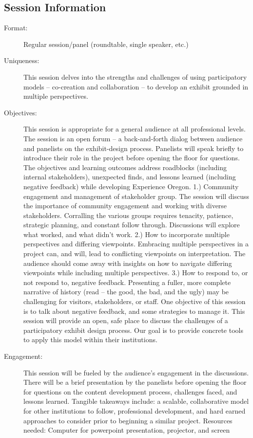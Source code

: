 \documentclass{report}
\begin{document}
              \subsection*{Session Information}
                \begin{description}
                  \item [Format:] Regular session/panel (roundtable, single speaker, etc.)
							    
							    \item [Uniqueness:]This session delves into the strengths and challenges of using participatory models – co-creation and collaboration – to develop an exhibit grounded in multiple perspectives.
							    \item [Objectives:]This session is appropriate for a general audience at all professional levels. The session is an open forum – a back-and-forth dialog between audience and panelists on the exhibit-design process.  Panelists will speak briefly to introduce their role in the project before opening the floor for questions.  The objectives and learning outcomes address roadblocks (including internal stakeholders), unexpected finds, and lessons learned (including negative feedback) while developing Experience Oregon.  1.) Community engagement and management of stakeholder group.  The session will discuss the importance of community engagement and working with diverse stakeholders.  Corralling the various groups requires tenacity, patience, strategic planning, and constant follow through. Discussions will explore what worked, and what didn’t work. 2.) How to incorporate multiple perspectives and differing viewpoints.  Embracing multiple perspectives in a project can, and will, lead to conflicting viewpoints on interpretation. The audience should come away with insights on how to navigate differing viewpoints while including multiple perspectives.  3.) How to respond to, or not respond to, negative feedback. Presenting a fuller, more complete narrative of history (read – the good, the bad, and the ugly) may be challenging for visitors, stakeholders, or staff. One objective of this session is to talk about negative feedback, and some strategies to manage it. This session will provide an open, safe place to discuss the challenges of a participatory exhibit design process. Our goal is to provide concrete tools to apply this model within their institutions.
							    \item [Engagement:]This session will be fueled by the audience’s engagement in the discussions. There will be a brief presentation by the panelists before opening the floor for questions on the content development process, challenges faced, and lessons learned. Tangible takeaways include: a scalable, collaborative model for other institutions to follow, professional development, and hard earned approaches to consider prior to beginning a similar project.   Resources needed: Computer for powerpoint presentation, projector, and screen

\end{description}
\end{document}
